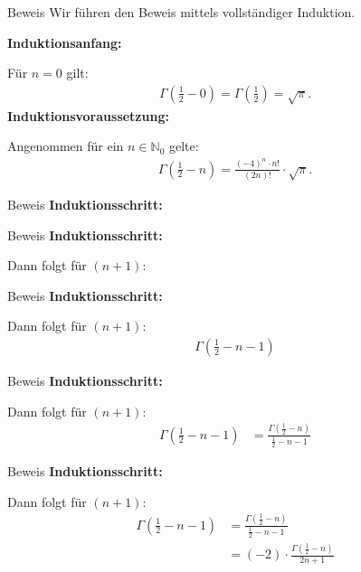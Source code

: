 \documentclass[10pt]{beamer}
\def\bN{\mathbb{N}}
\begin{document}
\begin{frame}{Beweis}
    Wir führen den Beweis mittels vollständiger Induktion.

    \textbf{Induktionsanfang:}
    
    Für \( n = 0 \) gilt:
    \begin{align*}
        \Gamma\left( \frac{1}{2} - 0 \right)
        = \Gamma\left( \frac{1}{2} \right) 
        = \sqrt{\pi}.
    \end{align*}
    \textbf{Induktionsvoraussetzung:}

    Angenommen für ein \( n \in \bN_{0} \) gelte:
    \begin{align*}
        \Gamma\left( \frac{1}{2} - n \right)
        = \frac{\left( - 4 \right)^{n} \cdot n!}{\left( 2n \right)!} \cdot \sqrt{\pi}.
    \end{align*}
\end{frame}



\begin{frame}{Beweis}
    \textbf{Induktionsschritt:}
\end{frame}



\begin{frame}{Beweis}
    \textbf{Induktionsschritt:}

    Dann folgt für \( \left( n + 1 \right) \):
\end{frame}



\begin{frame}{Beweis}
    \textbf{Induktionsschritt:}

    Dann folgt für \( \left( n + 1 \right) \):
    \begin{align*}
        \Gamma\left( \frac{1}{2} - n - 1  \right)
    \end{align*}
\end{frame}



\begin{frame}{Beweis}
    \textbf{Induktionsschritt:}

    Dann folgt für \( \left( n + 1 \right) \):
    \begin{align*}
        \Gamma\left( \frac{1}{2} - n - 1  \right)
        & = \frac{\Gamma\left( \frac{1}{2} - n \right)}{\frac{1}{2} - n - 1}
    \end{align*}
\end{frame}



\begin{frame}{Beweis}
    \textbf{Induktionsschritt:}

    Dann folgt für \( \left( n + 1 \right) \):
    \begin{align*}
        \Gamma\left( \frac{1}{2} - n - 1  \right)
        & = \frac{\Gamma\left( \frac{1}{2} - n \right)}{\frac{1}{2} - n - 1} \\
        & = \left( - 2 \right) \cdot \frac{\Gamma\left( \frac{1}{2} - n \right)}{2n + 1}
    \end{align*}
\end{frame}
\end{document}
